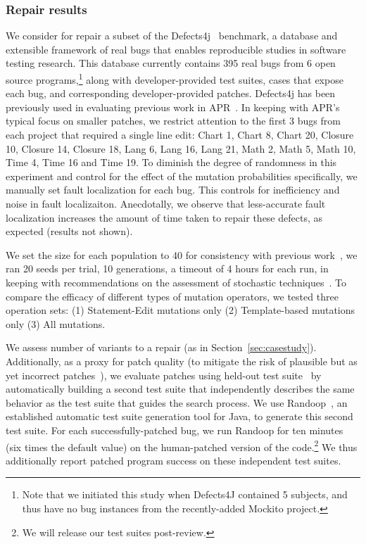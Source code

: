 \documentclass[conference]{IEEEtran}
\begin{document}
\subsubsection{Repair results}

We consider for repair a subset of the Defects4j~\cite{just14}
benchmark, a database and extensible 
framework of real bugs that enables reproducible studies in software testing 
research. This database currently contains 395 real bugs from 6
open source programs,\footnote{Note that we initiated this study when Defects4J
  contained 5 subjects, and thus have no bug instances from the recently-added
  Mockito project.} along with developer-provided test suites, cases that
expose each bug,  and
corresponding developer-provided patches. Defects4j has been previously used
in evaluating previous work in APR~\cite{Durieux15}.
In keeping with APR's typical focus on smaller patches, we
restrict attention to the first 3 bugs from each project that required a 
single line edit: Chart 1, 
Chart 8, Chart 20, Closure 10, Closure 14, Closure 18, Lang 6, Lang 16, Lang 21, 
Math 2, Math 5, Math 10, Time 4, Time 16 and Time 19.
To diminish the degree of randomness in this experiment and control for the
effect of the mutation probabilities specifically,  we manually
set fault localization for each bug.  This controls for inefficiency and noise
in fault localizaiton. Anecdotally, we observe that less-accurate fault localization increases the amount of
time taken to repair these defects, as expected (results not shown). 

We set the size for each population to 40 for consistency with 
previous work~\cite{legoues12,kim2013}, we ran 20
seeds per trial, 10 generations, a timeout of 4 hours for each run, in keeping with 
recommendations on the assessment of stochastic techniques~\cite{arcuri11}.
To compare the efficacy of different types of mutation operators,
we tested three operation sets: (1) Statement-Edit mutations only (2) Template-based mutations 
only (3) All mutations.  

We assess number of variants to a repair (as in
Section~\ref{sec:casestudy}).  Additionally, as a proxy for patch quality (to
mitigate the risk of plausible but as yet incorrect patches~\cite{Qi15}), we
evaluate patches using held-out test suite~\cite{legoues2012,Smith15} by automatically building a second
test suite that independently describes the same behavior as the test suite that
guides the search process. We use Randoop~\cite{pacheco07}, an established
automatic test suite generation tool for Java, to generate this second test
suite. 
For each successfully-patched bug, we 
run Randoop for ten minutes (six times the default value) on the human-patched
version of the code.\footnote{We will release our test suites post-review.}  We
thus additionally report patched program success on these independent test
suites. 
\end{document}
